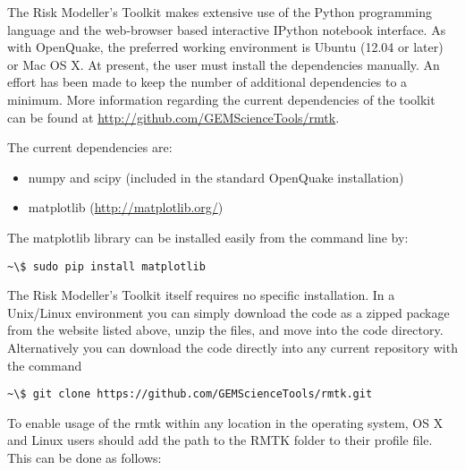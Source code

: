 The Risk Modeller's Toolkit makes extensive use of the Python programming language and the web-browser based interactive IPython notebook interface. As with OpenQuake, the preferred working environment is Ubuntu (12.04 or later) or Mac OS X. At present, the user  must install the dependencies manually. An effort has been made to keep the number of additional dependencies to a minimum. More information regarding the current dependencies of the toolkit can be found at \href{http://github.com/GEMScienceTools/rmtk}{http://github.com/GEMScienceTools/rmtk}.

The current dependencies are:
\begin{itemize}
\item numpy and scipy (included in the standard OpenQuake installation)
\item matplotlib (\href{http://matplotlib.org/}{http://matplotlib.org/})
\end{itemize}

The matplotlib library can be installed easily from the command line by:

\begin{Verbatim}[frame=single, commandchars=\\\{\}, fontsize=\scriptsize]
~\$ sudo pip install matplotlib
\end{Verbatim}

The Risk Modeller's Toolkit itself requires no specific installation. In a Unix/Linux environment you can simply download the code as a zipped package from the website listed above, unzip the files, and move into the code directory. Alternatively you can download the code directly into any current repository with the command

\begin{Verbatim}[frame=single, commandchars=\\\{\}, fontsize=\scriptsize]
~\$ git clone https://github.com/GEMScienceTools/rmtk.git
\end{Verbatim}

To enable usage of the rmtk within any location in the operating system, OS X and Linux users should add the path to the RMTK folder to their profile file. This can be done as follows:

